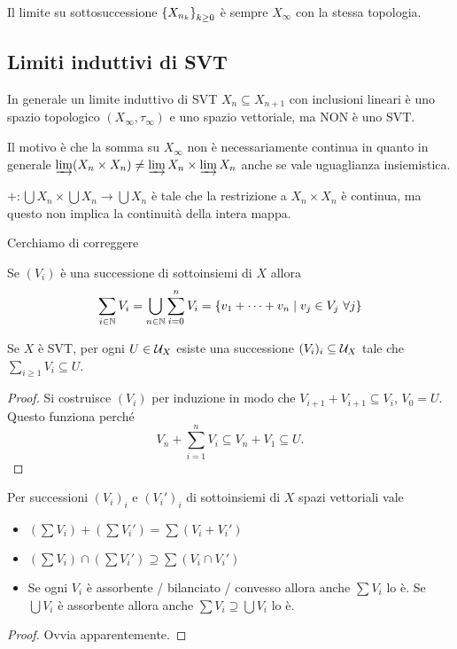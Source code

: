\begin{remark}
Il limite su sottosuccessione $\left\{{X_{n_k}}\right\}_{k\geq 0}$ \`e sempre $X_{\infty}$ con la stessa topologia.
\end{remark}

\subsection{Limiti induttivi di SVT}
\begin{remark}
In generale un limite induttivo di SVT $X_n\subseteq X_{n+1}$ con inclusioni lineari \`e uno spazio topologico $(X_\infty,\tau_\infty)$ e uno spazio vettoriale, ma NON \`e uno SVT.

Il motivo \`e che la somma su $X_\infty$ non \`e necessariamente continua in quanto in generale $\varinjlim (X_n\times X_n)\neq \varinjlim X_n\times\varinjlim X_n$ anche se vale uguaglianza insiemistica.

$+:\bigcup X_n\times \bigcup X_n\to \bigcup X_n$ \`e tale che la restrizione a $X_n\times X_n$ \`e continua, ma questo non implica la continuit\`a della intera mappa.
\end{remark}

Cerchiamo di correggere

\begin{notation}
Se $(V_i)$ \`e una successione di sottoinsiemi di $X$ allora
\[\sum_{i\in\mathbb{N}}V_i=\bigcup_{n\in\mathbb{N}}\sum_{i=0}^n V_i=\left\{{v_1+\cdots+v_n\mid v_j\in V_j\  \forall j}\right\}\]
\end{notation}

\begin{lemma}
Se $X$ \`e SVT, per ogni $U\in\mathcal{U}_X$ esiste una successione $(V_i)_i\subseteq \mathcal{U}_X$ tale che $\sum_{i\geq 1} V_i\subseteq U$.
\end{lemma}
\begin{proof}
Si costruisce $(V_i)$ per induzione in modo che $V_{i+1}+V_{i+1}\subseteq V_i$, $V_0=U$. Questo funziona perch\'e 
\[V_n+\sum_{i=1}^n V_i\subseteq V_n+V_1\subseteq U.\]
\end{proof}

\begin{lemma}
Per successioni $(V_i)_i$ e $(V_i')_i$ di sottoinsiemi di $X$ spazi vettoriali vale
\begin{itemize}
    \item $(\sum V_i)+(\sum V_i')=\sum(V_i+V_i')$
    \item $(\sum V_i)\cap (\sum V_i')\supseteq \sum(V_i\cap V_i')$
    \item Se ogni $V_i$ \`e assorbente / bilanciato / convesso allora anche $\sum V_i$ lo \`e. Se $\bigcup V_i$ \`e assorbente allora anche $\sum V_i\supseteq \bigcup V_i$ lo \`e.
\end{itemize}
\end{lemma}
\begin{proof}
Ovvia apparentemente.
\end{proof}

